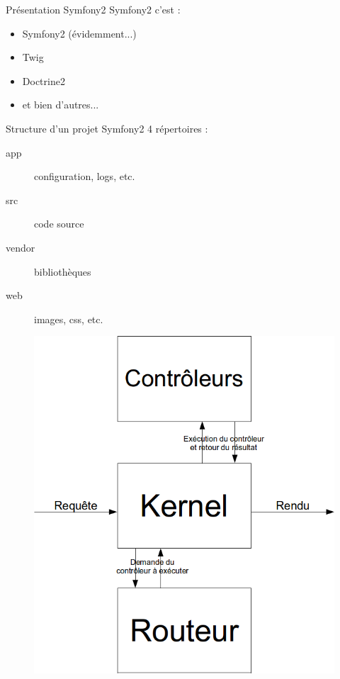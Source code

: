 \begin{frame}{Présentation Symfony2}
  Symfony2 c'est :
  \begin{itemize}
  \item Symfony2 (évidemment...)
  \item Twig
  \item Doctrine2
  \item et bien d'autres...
  \end{itemize}
\end{frame}

\begin{frame}{Structure d'un projet Symfony2}
  4 répertoires :
  \begin{description}
    \item[app] configuration, logs, etc.
    \item[src] code source
    \item[vendor] bibliothèques
    \item[web] images, css, etc.
  \end{description}
\end{frame}

\begin{frame}
   \begin{figure}
    \includegraphics[scale=0.25]{img/fonctionnement.png}
  \end{figure}  
\end{frame}

